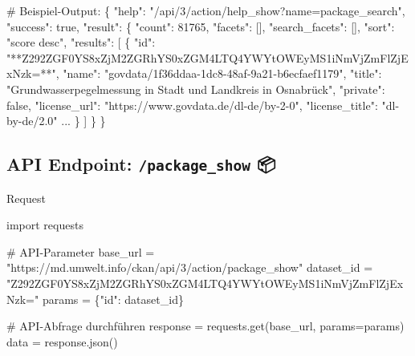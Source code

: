 \documentclass[
  letterpaper,
  DIV=11]{scrartcl}
\newenvironment{Shaded}{\begin{snugshade}}{\end{snugshade}}
\newcommand{\CommentTok}[1]{\textcolor[rgb]{0.37,0.37,0.37}{#1}}
\newcommand{\DecValTok}[1]{\textcolor[rgb]{0.68,0.00,0.00}{#1}}
\newcommand{\ImportTok}[1]{\textcolor[rgb]{0.00,0.46,0.62}{#1}}
\newcommand{\NormalTok}[1]{\textcolor[rgb]{0.00,0.23,0.31}{#1}}
\newcommand{\OperatorTok}[1]{\textcolor[rgb]{0.37,0.37,0.37}{#1}}
\newcommand{\StringTok}[1]{\textcolor[rgb]{0.13,0.47,0.30}{#1}}
\begin{document}
\begin{Shaded}
\begin{Highlighting}[]
\CommentTok{\# Beispiel{-}Output:}
\NormalTok{\{}
    \StringTok{"help"}\NormalTok{: }\StringTok{"/api/3/action/help\_show?name=package\_search"}\NormalTok{,}
    \StringTok{"success"}\NormalTok{: true,}
    \StringTok{"result"}\NormalTok{: \{}
        \StringTok{"count"}\NormalTok{: }\DecValTok{81765}\NormalTok{,}
        \StringTok{"facets"}\NormalTok{: [],}
        \StringTok{"search\_facets"}\NormalTok{: [],}
        \StringTok{"sort"}\NormalTok{: }\StringTok{"score desc"}\NormalTok{,}
        \StringTok{"results"}\NormalTok{: [}
\NormalTok{            \{}
                \StringTok{"id"}\NormalTok{: }\StringTok{"**Z292ZGF0YS8xZjM2ZGRhYS0xZGM4LTQ4YWYtOWEyMS1iNmVjZmFlZjExNzk=**"}\NormalTok{,}
                \StringTok{"name"}\NormalTok{: }\StringTok{"govdata/1f36ddaa{-}1dc8{-}48af{-}9a21{-}b6ecfaef1179"}\NormalTok{,}
                \StringTok{"title"}\NormalTok{: }\StringTok{"Grundwasserpegelmessung in Stadt und Landkreis in Osnabrück"}\NormalTok{,}
                \StringTok{"private"}\NormalTok{: false,}
                \StringTok{"license\_url"}\NormalTok{: }\StringTok{"https://www.govdata.de/dl{-}de/by{-}2{-}0"}\NormalTok{,}
                \StringTok{"license\_title"}\NormalTok{: }\StringTok{"dl{-}by{-}de/2.0"}
\NormalTok{                ...}
\NormalTok{            \}}
\NormalTok{        ]}
\NormalTok{    \}}
\NormalTok{\}}
\end{Highlighting}
\end{Shaded}

\subsection{\texorpdfstring{API Endpoint:
\textbf{\texttt{/package\_show}}
📦}{API Endpoint: /package\_show 📦}}\label{api-endpoint-package_show}

Request

\begin{Shaded}
\begin{Highlighting}[]
\ImportTok{import}\NormalTok{ requests}

\CommentTok{\# API{-}Parameter}
\NormalTok{base\_url }\OperatorTok{=} \StringTok{"https://md.umwelt.info/ckan/api/3/action/package\_show"}
\NormalTok{dataset\_id }\OperatorTok{=} \StringTok{"Z292ZGF0YS8xZjM2ZGRhYS0xZGM4LTQ4YWYtOWEyMS1iNmVjZmFlZjExNzk="}
\NormalTok{params }\OperatorTok{=}\NormalTok{ \{}\StringTok{"id"}\NormalTok{: dataset\_id\}}

\CommentTok{\# API{-}Abfrage durchführen}
\NormalTok{response }\OperatorTok{=}\NormalTok{ requests.get(base\_url, params}\OperatorTok{=}\NormalTok{params)}
\NormalTok{data }\OperatorTok{=}\NormalTok{ response.json()}
\end{Highlighting}
\end{Shaded}
\end{document}

